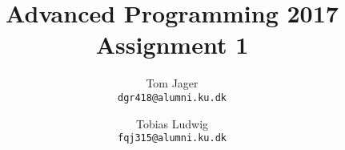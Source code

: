 \documentclass{article}
\title{Advanced Programming 2017\\Assignment 1}
\author{
Tom Jager\\
\texttt{dgr418@alumni.ku.dk}
\and
Tobias Ludwig\\
\texttt{fqj315@alumni.ku.dk}}
\begin{document}
\maketitle

\section{}
\end{document}

